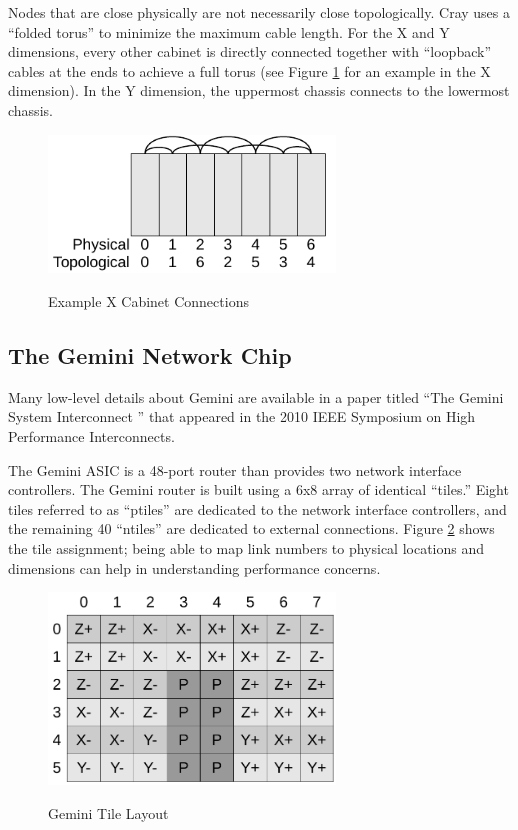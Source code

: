 \documentclass[10pt, conference, compsocconf]{IEEEtran}
\begin{document}
Nodes that are close physically are not necessarily close topologically.  Cray
uses a ``folded torus'' to minimize the maximum cable length.  For the X and Y
dimensions, every other cabinet is directly connected together with
``loopback'' cables at the ends to achieve a full torus (see Figure
\ref{fig:cabfold} for an example in the X dimension).  In the Y dimension, the
uppermost chassis connects to the lowermost chassis.

\begin{figure}
  \centering
  \includegraphics[width=3.0in]{figures/cabinets_folded.pdf}\\
  \caption{Example X Cabinet Connections}\label{fig:cabfold}
\end{figure}

\subsection{The Gemini Network Chip}

Many low-level details about Gemini are available in a paper titled ``The
Gemini System Interconnect \cite{hoti}'' that appeared in the 2010 IEEE
Symposium on High Performance Interconnects.

The Gemini ASIC is a 48-port router than provides two network interface
controllers.  The Gemini router is built using a 6x8 array of identical
``tiles.''  Eight tiles referred to as ``ptiles'' are dedicated to the network
interface controllers, and the remaining 40 ``ntiles'' are dedicated to
external connections.  Figure \ref{fig:tiles} shows the tile assignment; being
able to map link numbers to physical locations and dimensions can help in
understanding performance concerns.

\begin{figure}[h]
  \centering
  \includegraphics[width=3.0in]{figures/gemini_tiles.pdf}\\
  \caption{Gemini Tile Layout}\label{fig:tiles}
\end{figure}
\end{document}
